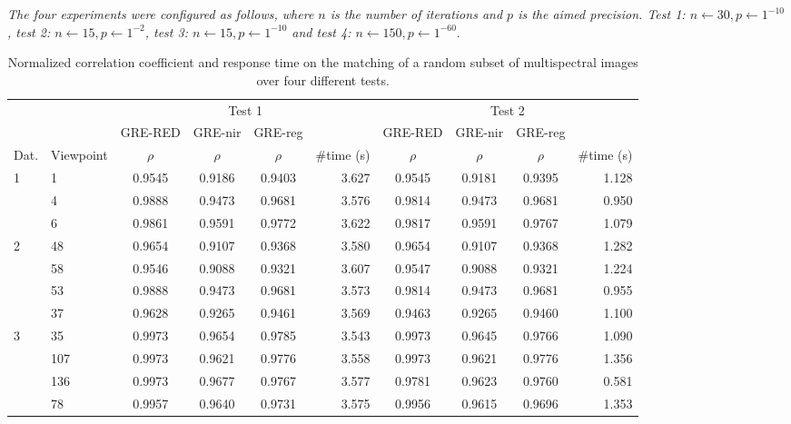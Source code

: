 \textit{The four experiments were configured as follows, where $n$ is the number of iterations and $p$ is the aimed precision. Test 1: $n \gets 30, p \gets 1^{-10}$, test 2: $n \gets 15, p \gets 1^{-2}$, test 3: $n \gets 15, p \gets 1^{-10}$ and test 4: $n \gets 150, p \gets 1^{-60}$}.

\renewcommand{\arraystretch}{1.1}
\begin{table}
    \footnotesize
    \caption{Normalized correlation coefficient and response time on the matching of a random subset of multispectral images over four different tests.}
    \label{table:multispectral_correlation_registration}
    \begin{tabular}{ll|cccr|cccr}
        \toprule
        \multicolumn{2}{c}{} & \multicolumn{4}{c}{Test 1} & \multicolumn{4}{c}{Test 2}\\
        \cmidrule{1-10}
        & & GRE-RED & GRE-\acrshort{nir} & GRE-\acrshort{reg} & & GRE-RED & GRE-\acrshort{nir} & GRE-\acrshort{reg}\\
        Dat. & Viewpoint & $\rho$ & $\rho$ & $\rho$ & \#time (\si{\second}) & $\rho$ & $\rho$ & $\rho$ & \#time (\si{\second}) \\
        \cmidrule{1-10}
        \multirow{3}{*}{1} & 1 & 0.9545 & 0.9186 & 0.9403 & 3.627 & 0.9545 & 0.9181 & 0.9395 & 1.128\\
        & 4 & 0.9888 & 0.9473 & 0.9681 & 3.576 & 0.9814 & 0.9473 & 0.9681 & 0.950\\
        & 6 & 0.9861 & 0.9591 & 0.9772 & 3.622 & 0.9817 & 0.9591 & 0.9767 & 1.079\\
        \cmidrule{1-10}
        \multirow{4}{*}{2} & 48 & 0.9654 & 0.9107 & 0.9368 & 3.580 & 0.9654 & 0.9107 & 0.9368 & 1.282\\
        & 58 & 0.9546 & 0.9088 & 0.9321 & 3.607 & 0.9547 & 0.9088 & 0.9321 & 1.224\\
        & 53 & 0.9888 & 0.9473 & 0.9681 & 3.573 & 0.9814 & 0.9473 & 0.9681 & 0.955\\
        & 37 & 0.9628 & 0.9265 & 0.9461 & 3.569 & 0.9463 & 0.9265 & 0.9460 & 1.100\\
        \cmidrule{1-10}
        \multirow{8}{*}{3} & 35 & 0.9973 & 0.9654 & 0.9785 & 3.543 & 0.9973 & 0.9645 & 0.9766 & 1.090\\
        & 107 & 0.9973 & 0.9621 & 0.9776 & 3.558 & 0.9973 & 0.9621 & 0.9776 & 1.356\\
        & 136 & 0.9973 & 0.9677 & 0.9767 & 3.577 & 0.9781 & 0.9623 & 0.9760 & 0.581\\
        & 78 & 0.9957 & 0.9640 & 0.9731 & 3.575 & 0.9956 & 0.9615 & 0.9696 & 1.353\\

\end{tabular}
\end{table}
